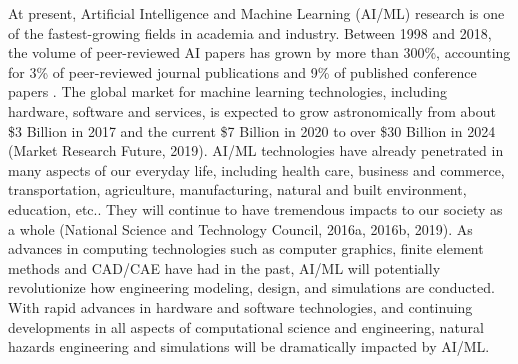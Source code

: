 At present, Artificial Intelligence and Machine Learning (AI/ML) research is one of the fastest-growing fields in academia and industry. Between 1998 and 2018, the volume of peer-reviewed AI papers has grown by more than 300\%, accounting for 3\% of peer-reviewed journal publications and 9\% of published conference papers \citep{perrault2019ai}. The global market for machine learning technologies, including hardware, software and services, is expected to grow astronomically from about \$3 Billion in 2017 and the current \$7 Billion in 2020 to over \$30 Billion in 2024 (Market Research Future, 2019). AI/ML technologies have already penetrated in many aspects of our everyday life, including health care, business and commerce, transportation, agriculture, manufacturing, natural and built environment, education, etc.. They will continue to have tremendous impacts to our society as a whole (National Science and Technology Council, 2016a, 2016b, 2019). As advances in computing technologies such as computer graphics, finite element methods and CAD/CAE have had in the past, AI/ML will potentially revolutionize how engineering modeling, design, and simulations are conducted. With rapid advances in hardware and software technologies, and continuing developments in all aspects of computational science and engineering, natural hazards engineering and simulations will be dramatically impacted by AI/ML.

